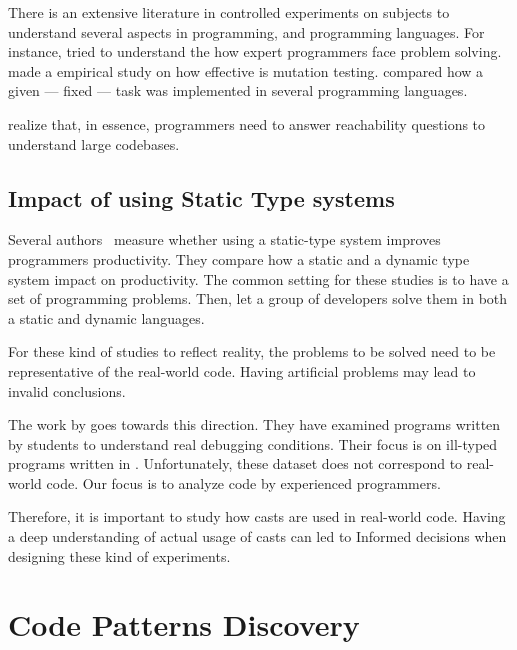 \label{sec:controlled-experiments}

There is an extensive literature \perse{} in controlled experiments on subjects to understand several aspects in programming, and programming languages.
For instance, \cite{soloway_empirical_1984} tried to understand the how expert programmers face problem solving.
\cite{budd_theoretical_1980} made a empirical study on how effective is mutation testing.
\cite{prechelt_empirical_2000} compared how a given --- fixed --- task was implemented in several programming languages.

\cite{latoza_developers_2010} realize that, in essence, programmers need to answer reachability questions to understand large codebases.

\subsection*{Impact of using Static Type systems}

Several authors~\cite{stuchlik_static_2011,mayer_empirical_2012,harlin_impact_2017} measure whether using a static-type system improves programmers productivity.
They compare how a static and a dynamic type system impact on productivity.
The common setting for these studies is to have a set of programming problems.
Then, let a group of developers solve them in both a static and dynamic languages.

For these kind of studies to reflect reality, the problems to be solved need to
be representative of the real-world code.
Having artificial problems may lead to invalid conclusions.

The work by \cite{wu_how_2017,wu_learning_2017} goes towards this direction.
They have examined programs written by students to understand real debugging conditions.
Their focus is on ill-typed programs written in \haskell{}.
Unfortunately, these dataset does not correspond to real-world code.
Our focus is to analyze code by experienced programmers.

Therefore, it is important to study how casts are used in real-world code.
Having a deep understanding of actual usage of casts can led to
Informed decisions when designing these kind of experiments.


\section{Code Patterns Discovery}

\label{sec:pattern-discovery}

